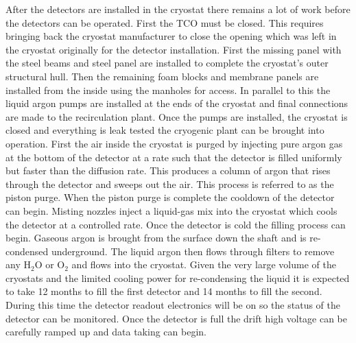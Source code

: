 After the detectors are installed in the cryostat there remains a lot
of work before the detectors can be operated. First the TCO must be
closed. This requires bringing back the cryostat manufacturer to close
the opening which was left in the cryostat originally for the detector
installation. First the missing panel with the steel beams and steel
panel are installed to complete the cryostat's outer structural
hull. Then the remaining foam blocks and membrane panels are installed
from the inside using the manholes for access. In parallel to this the
liquid argon pumps are installed at the ends of the cryostat and final
connections are made to the recirculation plant. Once the pumps are
installed, the cryostat is closed and everything is leak tested the
cryogenic plant can be brought into operation. First the air inside
the cryostat is purged by injecting pure argon gas at the bottom of
the detector at a rate such that the detector is filled uniformly but
faster than the diffusion rate. This produces a column of argon that
rises through the detector and sweeps out the air. This process is
referred to as the piston purge. When the piston purge is complete the
cooldown of the detector can begin. Misting nozzles inject a
liquid-gas mix into the cryostat which cools the detector at a
controlled rate. Once the detector is cold the filling process can
begin. Gaseous argon is brought from the surface down the shaft and is
re-condensed underground. The liquid argon then flows through filters
to remove any H$_2$O or O$_2$ and flows into the cryostat. Given the
very large volume of the cryostats and the limited cooling power for
re-condensing the liquid it is expected to take 12 months to fill the
first detector and 14 months to fill the second. During this time the
detector readout electronics will be on so the status of the detector
can be monitored. Once the detector is full the drift high voltage can
be carefully ramped up and data taking can begin.


